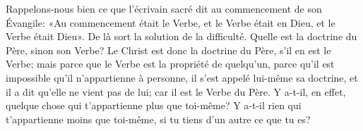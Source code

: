 Rappelons-nous bien ce que l’écrivain sacré dit au commencement de son Évangile:
	«Au commencement était le Verbe,
	et le Verbe était en Dieu, et le Verbe était Dieu».
De là sort la solution de la difficulté.
Quelle est la doctrine du Père, sinon son Verbe?
Le Christ est donc la doctrine du Père, s’il en est le Verbe;
	mais parce que le Verbe est la propriété de quelqu’un,
	parce qu’il est impossible qu’il n’appartienne à personne,
	il s’est appelé lui-même sa doctrine,
	et il a dit qu’elle ne vient pas de lui;
	car il est le Verbe du Père.
Y a-t-il, en effet, quelque chose qui t’appartienne plus que toi-même?
Y a-t-il rien qui t’appartienne moins que toi-même,
	si tu tiens d’un autre ce que tu es?
